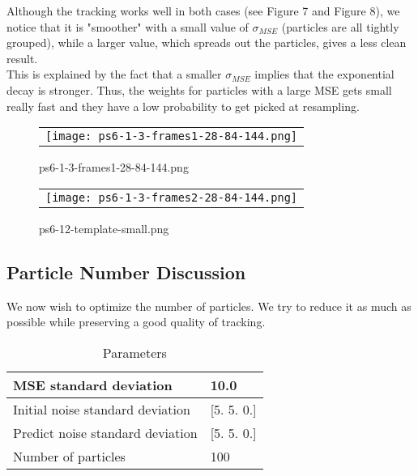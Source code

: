 \documentclass[a4paper,11pt]{article}
\begin{document}
Although the tracking works well in both cases (see Figure 7 and Figure 8), we notice that it is "smoother" with a small value of $\sigma_{MSE}$ (particles are all tightly grouped), while a larger value, which spreads out the particles, gives a less clean result.\\
This is explained by the fact that a smaller $\sigma_{MSE}$ implies that the exponential decay is stronger. Thus, the weights for particles with a large MSE gets small really fast and they have a low probability to get picked at resampling.


\begin{figure}[H]
\begin{center}
\begin{tabular}{c}
	\texttt{[image: ps6-1-3-frames1-28-84-144.png]}\\
\end{tabular}
\end{center}
\caption{ps6-1-3-frames1-28-84-144.png}
\label{ps-6-3-c}
\end{figure}


\begin{figure}[H]
\begin{center}
\begin{tabular}{c}
	\texttt{[image: ps6-1-3-frames2-28-84-144.png]}\\
\end{tabular}
\end{center}
\caption{ps6-12-template-small.png}
\label{ps-6-3-d}
\end{figure}

\subsection{Particle Number Discussion}

We now wish to optimize the number of particles. We try to reduce it as much as possible while preserving a good quality of tracking.

\begin{table}[H]
\centering
\caption{Parameters}
\begin{tabular}{|l|l|}
\hline
MSE standard deviation        & 10.0           \\ \hline
Initial noise standard deviation & {[}5. 5. 0.{]} \\ \hline
Predict noise standard deviation & {[}5. 5. 0.{]} \\ \hline
Number of particles              & 100            \\ \hline
\end{tabular}
\end{table}
\end{document}
